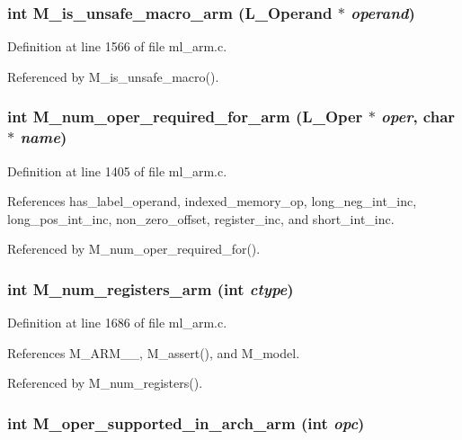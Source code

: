 \subsubsection{\setlength{\rightskip}{0pt plus 5cm}int M\_\-is\_\-unsafe\_\-macro\_\-arm (L\_\-Operand $\ast$ {\em operand})}\label{ml__arm_8c_c7f01812e4981b5a5c367e89aa8bbb44}




Definition at line 1566 of file ml\_\-arm.c.

Referenced by M\_\-is\_\-unsafe\_\-macro().
\subsubsection{\setlength{\rightskip}{0pt plus 5cm}int M\_\-num\_\-oper\_\-required\_\-for\_\-arm (L\_\-Oper $\ast$ {\em oper}, char $\ast$ {\em name})}\label{ml__arm_8c_a4af2338b49e95ac3d2f46e4fef25d17}




Definition at line 1405 of file ml\_\-arm.c.

References has\_\-label\_\-operand, indexed\_\-memory\_\-op, long\_\-neg\_\-int\_\-inc, long\_\-pos\_\-int\_\-inc, non\_\-zero\_\-offset, register\_\-inc, and short\_\-int\_\-inc.

Referenced by M\_\-num\_\-oper\_\-required\_\-for().
\subsubsection{\setlength{\rightskip}{0pt plus 5cm}int M\_\-num\_\-registers\_\-arm (int {\em ctype})}\label{ml__arm_8c_46f8873c38af373c04bf4ee93a988f21}




Definition at line 1686 of file ml\_\-arm.c.

References M\_\-ARM\_\_, M\_\-assert(), and M\_\-model.

Referenced by M\_\-num\_\-registers().
\subsubsection{\setlength{\rightskip}{0pt plus 5cm}int M\_\-oper\_\-supported\_\-in\_\-arch\_\-arm (int {\em opc})}\label{ml__arm_8c_26978e7f9d7c87c011af90627774611d}




